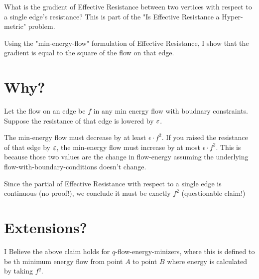 

What is the gradient of Effective Resistance between two vertices with
respect
to a single edge's resistance? This is part of the "Is Effective Resistance a
Hyper-metric" problem.

Using the "min-energy-flow" formulation of Effective Resistance, I show
that the gradient is equal to the square of the flow on that edge.

\section{Why?}
Let the flow on an edge be $f$ in any min energy flow with boudnary
constraints. Suppose the resistance of that edge is lowered by $\varepsilon$.

The min-energy flow must decrease by at least $\epsilon \cdot f^2$.
If you raised the resistance of that edge by $\varepsilon$, the min-energy flow
must increase by at most $\epsilon \cdot f^2$. This is because those two
values are the change in flow-energy assuming the underlying
flow-with-boundary-conditions doesn't change.

Since the partial of Effective Resistance with respect to a single edge
is continuous (no proof!), we conclude it must be exactly $f^2$
(questionable claim!)

\section{Extensions?}
I Believe the above claim holds for $q$-flow-energy-minizers, where this
is defined to be th minimum energy flow from point $A$ to point $B$
where energy is calculated by taking $f^q$.


